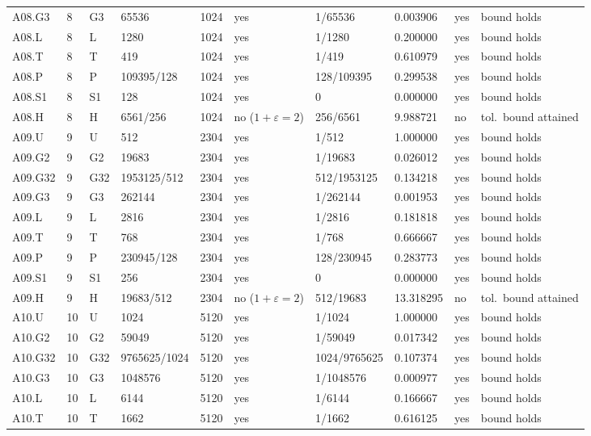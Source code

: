 {\begin{longtable}{@{}llllrlllll@{}}
A08.G3 & 8 & G3 & 65536 & 1024 & yes & 1/65536 & 0.003906 & yes & bound holds \\
A08.L & 8 & L & 1280 & 1024 & yes & 1/1280 & 0.200000 & yes & bound holds \\
A08.T & 8 & T & 419 & 1024 & yes & 1/419 & 0.610979 & yes & bound holds \\
A08.P & 8 & P & 109395/128 & 1024 & yes & 128/109395 & 0.299538 & yes & bound holds \\
A08.S1 & 8 & S1 & 128 & 1024 & yes & 0 & 0.000000 & yes & bound holds \\
A08.H & 8 & H & 6561/256 & 1024 & no ($1{+}\varepsilon=2$) & 256/6561 & 9.988721 & no & tol.\ bound attained \\
A09.U & 9 & U & 512 & 2304 & yes & 1/512 & 1.000000 & yes & bound holds \\
A09.G2 & 9 & G2 & 19683 & 2304 & yes & 1/19683 & 0.026012 & yes & bound holds \\
A09.G32 & 9 & G32 & 1953125/512 & 2304 & yes & 512/1953125 & 0.134218 & yes & bound holds \\
A09.G3 & 9 & G3 & 262144 & 2304 & yes & 1/262144 & 0.001953 & yes & bound holds \\
A09.L & 9 & L & 2816 & 2304 & yes & 1/2816 & 0.181818 & yes & bound holds \\
A09.T & 9 & T & 768 & 2304 & yes & 1/768 & 0.666667 & yes & bound holds \\
A09.P & 9 & P & 230945/128 & 2304 & yes & 128/230945 & 0.283773 & yes & bound holds \\
A09.S1 & 9 & S1 & 256 & 2304 & yes & 0 & 0.000000 & yes & bound holds \\
A09.H & 9 & H & 19683/512 & 2304 & no ($1{+}\varepsilon=2$) & 512/19683 & 13.318295 & no & tol.\ bound attained \\
A10.U & 10 & U & 1024 & 5120 & yes & 1/1024 & 1.000000 & yes & bound holds \\
A10.G2 & 10 & G2 & 59049 & 5120 & yes & 1/59049 & 0.017342 & yes & bound holds \\
A10.G32 & 10 & G32 & 9765625/1024 & 5120 & yes & 1024/9765625 & 0.107374 & yes & bound holds \\
A10.G3 & 10 & G3 & 1048576 & 5120 & yes & 1/1048576 & 0.000977 & yes & bound holds \\
A10.L & 10 & L & 6144 & 5120 & yes & 1/6144 & 0.166667 & yes & bound holds \\
A10.T & 10 & T & 1662 & 5120 & yes & 1/1662 & 0.616125 & yes & bound holds \\

\end{longtable}}
